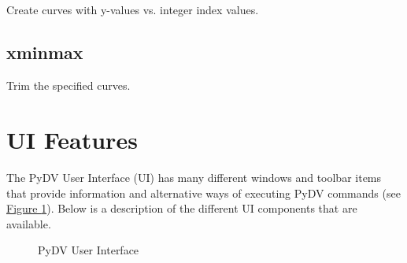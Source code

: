 \documentclass[letterpaper,10pt,english]{sphinxmanual}
\begin{document}
\subsection{}
\label{\detokenize{curve_control_cmds:xindex-2-4}}
Create curves with y-values vs. integer index values.

\begin{sphinxVerbatim}[commandchars=\\\{\}]
\PYG{p}{[}\PYG{p}{]}  
\end{sphinxVerbatim}


\subsection{xminmax}
\label{\detokenize{curve_control_cmds:xminmax}}
Trim the specified curves. 

\begin{sphinxVerbatim}[commandchars=\\\{\}]
\PYG{p}{[}\PYG{p}{]}    
\end{sphinxVerbatim}


\section{UI Features}
\label{\detokenize{ui_features:ui-features}}\label{\detokenize{ui_features:id1}}\label{\detokenize{ui_features::doc}}
The PyDV User Interface (UI) has many different windows and toolbar items that provide information and alternative ways of executing PyDV commands (see \hyperref[\detokenize{ui_features:pydv}]{Figure \ref{\detokenize{ui_features:pydv}}}). Below is a description of the different UI components that are available.

\begin{figure}[htbp]
\centering
\capstart

\noindent{}
\caption{PyDV User Interface}\label{\detokenize{ui_features:id3}}\label{\detokenize{ui_features:pydv}}\end{figure}
\end{document}
